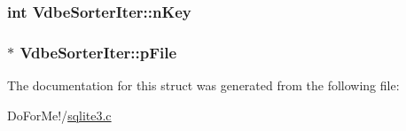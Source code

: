 \hypertarget{struct_vdbe_sorter_iter_a6c73b1e17f13a83fa99c21ab5fc4cf2b}{
\subsubsection[{n\-Key}]{\setlength{\rightskip}{0pt plus 5cm}int Vdbe\-Sorter\-Iter\-::n\-Key}}\label{struct_vdbe_sorter_iter_a6c73b1e17f13a83fa99c21ab5fc4cf2b}
\hypertarget{struct_vdbe_sorter_iter_ac6487cb536e6a3ba6209a5446b4ce0b0}{
\subsubsection[{p\-File}]{$\ast$ Vdbe\-Sorter\-Iter\-::p\-File}}\label{struct_vdbe_sorter_iter_ac6487cb536e6a3ba6209a5446b4ce0b0}


The documentation for this struct was generated from the following file\-:\begin{DoxyCompactItemize}
\item 
Do\-For\-Me!/\hyperlink{sqlite3_8c}{sqlite3.\-c}\end{DoxyCompactItemize}
